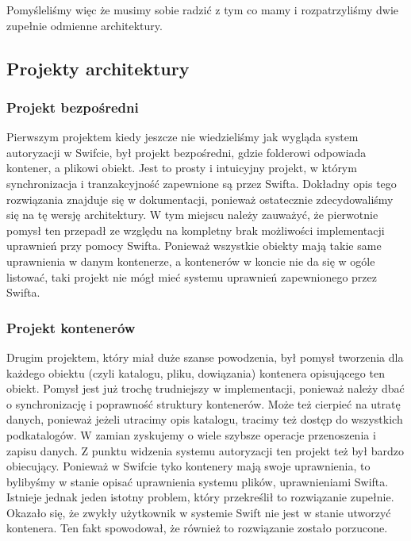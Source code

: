 	Pomyśleliśmy więc że musimy sobie radzić z tym co mamy i rozpatrzyliśmy dwie zupełnie odmienne architektury.
	
	\subsection{Projekty architektury}\label{sec:projekty architektury}

	\subsubsection{Projekt bezpośredni}\label{sub:projekt bezposredni}

	Pierwszym projektem kiedy jeszcze nie wiedzieliśmy jak wygląda system autoryzacji w Swifcie, był projekt bezpośredni, gdzie folderowi odpowiada kontener, a plikowi obiekt. Jest to prosty i intuicyjny projekt, w którym synchronizacja i tranzakcyjność zapewnione są przez Swifta. Dokładny opis tego rozwiązania znajduje się w dokumentacji, ponieważ ostatecznie zdecydowaliśmy się na tę wersję architektury. W tym miejscu należy zauważyć, że pierwotnie pomysł ten przepadł ze względu na kompletny brak możliwości implementacji uprawnień przy pomocy Swifta. Ponieważ wszystkie obiekty mają takie same uprawnienia w danym kontenerze, a kontenerów w koncie nie da się w ogóle listować, taki projekt nie mógł mieć systemu uprawnień zapewnionego przez Swifta.
	
	\subsubsection{Projekt kontenerów}\label{sub:projekt kontenerow}

	Drugim projektem, który miał duże szanse powodzenia, był pomysł tworzenia dla każdego obiektu (czyli katalogu, pliku, dowiązania) kontenera opisującego ten obiekt. Pomysł jest już trochę trudniejszy w implementacji, ponieważ należy dbać o synchronizację i poprawność struktury kontenerów. Może też cierpieć na utratę danych, ponieważ jeżeli utracimy opis katalogu, tracimy też dostęp do wszystkich podkatalogów. W zamian zyskujemy o wiele szybsze operacje przenoszenia i zapisu danych. Z punktu widzenia systemu autoryzacji ten projekt też był bardzo obiecujący. Ponieważ w Swifcie tyko kontenery mają swoje uprawnienia, to bylibyśmy w stanie opisać uprawnienia systemu plików, uprawnieniami Swifta. Istnieje jednak jeden istotny problem, który przekreślił to rozwiązanie zupełnie. Okazało się, że zwykły użytkownik w systemie Swift nie jest w stanie utworzyć kontenera. Ten fakt spowodował, że również to rozwiązanie zostało porzucone.

